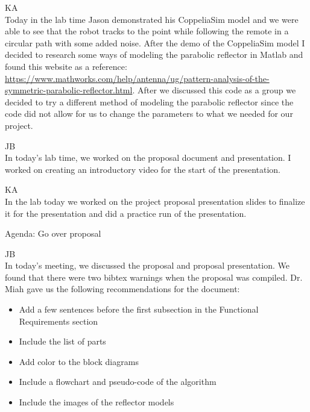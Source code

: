 \documentclass[fontsize=11pt, %
                             paper=letter, %
                             openany, %
                             captions=tableheading,
                             index=totoc,
                             hyperref]{labbook}
\begin{document}
\begin{addmargin}[0cm]{0cm}
\vspace*{12pt}
\vspace*{12pt}
KA\\
Today in the lab time Jason demonstrated his CoppeliaSim model and we were able to see that the robot tracks to the point while following the remote in a circular path with some added noise. After the demo of the CoppeliaSim model I decided to research some ways of modeling the parabolic reflector in Matlab and found this website as a reference: \href{https://www.mathworks.com/help/antenna/ug/pattern-analysis-of-the-symmetric-parabolic-reflector.html}{https://www.mathworks.com/help/antenna/ug/pattern-analysis-of-the-symmetric-parabolic-reflector.html}. After we discussed this code as a group we decided to try a different method of modeling the parabolic reflector since the code did not allow for us to change the parameters to what we needed for our project.



JB\\
In today's lab time, we worked on the proposal document and presentation. I worked on creating an introductory video for the start of the presentation.

\vspace*{12pt}
KA\\
In the lab today we worked on the project proposal presentation slides to finalize it for the presentation and did a practice run of the presentation.

Agenda: Go over proposal

JB\\
In today's meeting, we discussed the proposal and proposal presentation. We found that there were two bibtex warnings when the proposal was compiled. Dr. Miah gave us the following recommendations for the document:
\begin{itemize}
    \item Add a few sentences before the first subsection in the Functional Requirements section
    \item Include the list of parts
    \item Add color to the block diagrams
    \item Include a flowchart and pseudo-code of the algorithm
    \item Include the images of the reflector models
\end{itemize}


\end{addmargin}
\end{document}
